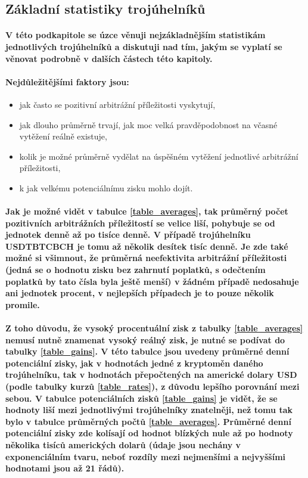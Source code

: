 \documentclass[thesis=B,czech]{FITthesis}[2019/03/21]
\begin{document}
\subsection{Základní statistiky trojúhelníků}
\paragraph{
V této podkapitole se úzce věnuji nejzákladnějším statistikám jednotlivých trojúhelníků a diskutuji nad tím, jakým se vyplatí se věnovat podrobně v dalších částech této kapitoly.
}
\paragraph{
Nejdůležitějšími faktory jsou: 
}
\begin{itemize}
    \item jak často se pozitivní arbitrážní příležitosti vyskytují,
    \item jak dlouho průměrně trvají, jak moc velká pravděpodobnost na včasné vytěžení reálně existuje,
    \item kolik je možné průměrně vydělat na úspěšném vytěžení jednotlivé arbitrážní příležitosti,
    \item k jak velkému potenciálnímu zisku mohlo dojít.
\end{itemize}
\paragraph{
Jak je možné vidět v tabulce \ref{table_averages}, tak průměrný počet pozitivních arbitrážních příležitostí se velice liší, pohybuje se od jednotek denně až po tisíce denně. V případě trojúhelníku USDTBTCBCH je tomu až několik desítek tisíc denně. Je zde také možné si všimnout, že průměrná neefektivita arbitrážní příležitosti (jedná se o hodnotu zisku bez zahrnutí poplatků, s odečtením poplatků by tato čísla byla ještě menší) v žádném případě nedosahuje ani jednotek procent, v nejlepších případech je to pouze několik promile.
}
\paragraph{
Z toho důvodu, že vysoký procentuální zisk z tabulky \ref{table_averages} nemusí nutně znamenat vysoký reálný zisk, je nutné se podívat do tabulky \ref{table_gains}. V této tabulce jsou uvedeny průměrné denní potenciální zisky, jak v hodnotách jedné z kryptoměn daného trojúhelníku, tak v hodnotách přepočtených na americké dolary USD (podle tabulky kurzů \ref{table_rates}), z důvodu lepšího porovnání mezi sebou. V tabulce potenciálních zisků \ref{table_gains} je vidět, že se hodnoty liší mezi jednotlivými trojúhelníky znatelněji, než tomu tak bylo v tabulce průměrných počtů \ref{table_averages}. Průměrné denní potenciální zisky zde kolísají od hodnot blízkých nule až po hodnoty několika tisíců amerických dolarů (údaje jsou nechány v exponenciálním tvaru, neboť rozdíly mezi nejmenšími a nejvyššími hodnotami jsou až 21 řádů). 
}
\end{document}
